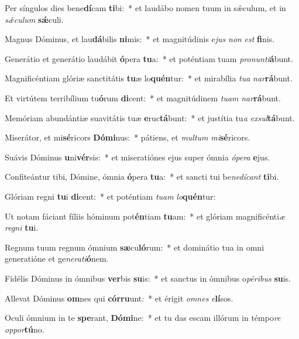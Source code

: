 \item Per síngulos dies bene\textbf{dí}cam \textbf{ti}bi:~* et laudábo nomen tuum in sǽculum, et in \textit{sǽ}\textit{cu}\textit{lum} \textbf{sǽ}culi.
\item Magnus Dóminus, et lau\textbf{dá}bilis \textbf{ni}mis:~* et magnitúdinis e\textit{jus} \textit{non} \textit{est} \textbf{fi}nis.
\item Generátio et generátio laudábit \textbf{ó}pera \textbf{tu}a:~* et poténtiam tuam \textit{pro}\textit{nun}\textit{ti}\textbf{á}bunt.
\item Magnificéntiam glóriæ sanctitátis \textbf{tu}æ lo\textbf{quén}tur:~* et mirabília \textit{tu}\textit{a} \textit{nar}\textbf{rá}bunt.
\item Et virtútem terribílium tu\textbf{ó}rum \textbf{di}cent:~* et magnitúdinem \textit{tu}\textit{am} \textit{nar}\textbf{rá}bunt.
\item Memóriam abundántiæ suavitátis tuæ \textbf{e}ruc\textbf{tá}bunt:~* et justítia tu\textit{a} \textit{ex}\textit{sul}\textbf{tá}bunt.
\item Miserátor, et mi\textbf{sé}ricors \textbf{Dó}\textbf{mi}nus:~* pátiens, et \textit{mul}\textit{tum} \textit{mi}\textbf{sé}ricors.
\item Suávis Dóminus \textbf{u}ni\textbf{vér}sis:~* et miseratiónes ejus super ómnia \textit{ó}\textit{pe}\textit{ra} \textbf{e}jus.
\item Confiteántur tibi, Dómine, ómnia \textbf{ó}pera \textbf{tu}a:~* et sancti tui be\textit{ne}\textit{dí}\textit{cant} \textbf{ti}bi.
\item Glóriam regni \textbf{tu}i \textbf{di}cent:~* et poténtiam \textit{tu}\textit{am} \textit{lo}\textbf{quén}tur:
\item Ut notam fáciant fíliis hóminum pot\textbf{én}tiam \textbf{tu}am:~* et glóriam magnificénti\textit{æ} \textit{re}\textit{gni} \textbf{tu}i.
\item Regnum tuum regnum ómnium \textbf{sæ}cu\textbf{ló}rum:~* et dominátio tua in omni generatióne et ge\textit{ne}\textit{ra}\textit{ti}\textbf{ó}nem.
\item Fidélis Dóminus in ómnibus \textbf{ver}bis \textbf{su}is:~* et sanctus in ómnibus o\textit{pé}\textit{ri}\textit{bus} \textbf{su}is.
\item Allevat Dóminus \textbf{om}nes qui \textbf{cór}\textbf{ru}unt:~* et érigit \textit{om}\textit{nes} \textit{e}\textbf{lí}sos.
\item Oculi ómnium in te \textbf{spe}rant, \textbf{Dó}\textbf{mi}ne:~* et tu das escam illórum in témpo\textit{re} \textit{op}\textit{por}\textbf{tú}no.
